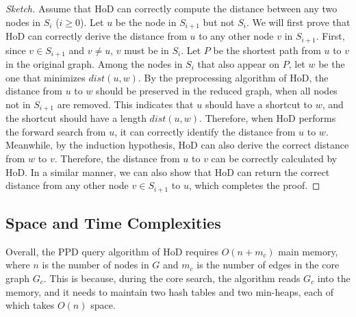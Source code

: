 \documentclass{sig-alternate}
\def\GC{G_c}
\def\d{dist}
\begin{document}
\begin{sloppy}
\begin{proof}[Sketch]
Assume that HoD can correctly compute the distance between any two nodes in $S_i$ ($i \ge 0$). Let $u$ be the node in $S_{i+1}$ but not $S_i$. We will first prove that HoD can correctly derive the distance from $u$ to any other node $v$ in $S_{i+1}$. First, since $v \in S_{i+1}$ and $v \ne u$, $v$ must be in $S_i$. Let $P$ be the shortest path from $u$ to $v$ in the original graph. Among the nodes in $S_i$ that also appear on $P$, let $w$ be the one that minimizes $\d(u, w)$. By the preprocessing algorithm of HoD, the distance from $u$ to $w$ should be preserved in the reduced graph, when all nodes not in $S_{i+1}$ are removed. This indicates that $u$ should have a shortcut to $w$, and the shortcut should have a length $\d(u, w)$. Therefore, when HoD performs the forward search from $u$, it can correctly identify the distance from $u$ to $w$. Meanwhile, by the induction hypothesis, HoD can also derive the correct distance from $w$ to $v$. Therefore, the distance from $u$ to $v$ can be correctly calculated by HoD. In a similar manner, we can also show that HoD can return the correct distance from any other node $v \in S_{i+1}$ to $u$, which completes the proof.
%
\end{proof}

\subsection{Space and Time Complexities} \label{sec:p2p-complex}

Overall, the PPD query algorithm of HoD requires $O(n + m_c)$ main memory, where $n$ is the number of nodes in $G$ and $m_c$ is the number of edges in the core graph $\GC$. This is because, during the core search, the algorithm reads $\GC$ into the memory, and it needs to maintain two hash tables and two min-heaps, each of which takes $O(n)$ space.


\end{sloppy}
\end{document}
